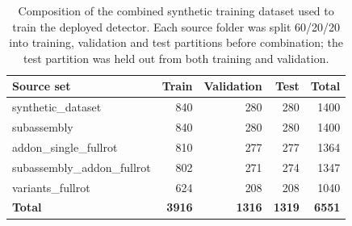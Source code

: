 \begin{table}[htbp]
\centering
\caption{Composition of the combined synthetic training dataset used to train the deployed detector. Each source folder was split 60/20/20 into training, validation and test partitions before combination; the test partition was held out from both training and validation.}
\label{tab:dataset_split}
\begin{tabular}{lrrrr}
\hline
Source set & Train & Validation & Test & Total \\
\hline
synthetic\_dataset & 840 & 280 & 280 & 1400 \\
subassembly & 840 & 280 & 280 & 1400 \\
addon\_single\_fullrot & 810 & 277 & 277 & 1364 \\
subassembly\_addon\_fullrot & 802 & 271 & 274 & 1347 \\
variants\_fullrot & 624 & 208 & 208 & 1040 \\
\hline
\textbf{Total} & \textbf{3916} & \textbf{1316} & \textbf{1319} & \textbf{6551} \\
\hline
\end{tabular}
\end{table}
